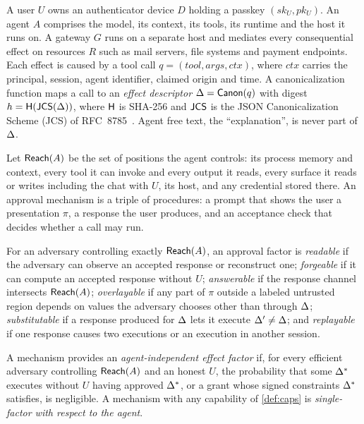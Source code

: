 A user $U$ owns an authenticator device $D$ holding a passkey $(sk_U, pk_U)$. An agent $A$ comprises the model,
its context, its tools, its runtime and the host it runs on. A gateway $G$ runs on a separate host and mediates
every consequential effect on resources $R$ such as mail servers, file systems and payment endpoints. Each effect
is caused by a tool call $q=(\mathit{tool},\mathit{args},\mathit{ctx})$, where $\mathit{ctx}$ carries the
principal, session, agent identifier, claimed origin and time. A canonicalization function maps a call to an
\emph{effect descriptor} $\Delta=\mathsf{Canon}(q)$ with digest $h=\mathsf{H}(\mathsf{JCS}(\Delta))$, where $\mathsf{H}$ is
SHA-256 and $\mathsf{JCS}$ is the JSON Canonicalization Scheme (JCS) of RFC~8785~\citep{rfc8785}. Agent free text, the
``explanation'', is never part of $\Delta$.

Let $\mathsf{Reach}(A)$ be the set of positions the agent controls: its process memory and context, every tool it can
invoke and every output it reads, every surface it reads or writes including the chat with $U$, its host, and
any credential stored there. An approval mechanism is a triple of procedures: a prompt that shows the user a
presentation $\pi$, a response the user produces, and an acceptance check that decides whether a call may run.

\begin{definition}\label{def:caps}
For an adversary controlling exactly $\mathsf{Reach}(A)$, an approval factor is \emph{readable} if the adversary can
observe an accepted response or reconstruct one; \emph{forgeable} if it can compute an accepted response without
$U$; \emph{answerable} if the response channel intersects $\mathsf{Reach}(A)$; \emph{overlayable} if any part of $\pi$
outside a labeled untrusted region depends on values the adversary chooses other than through $\Delta$;
\emph{substitutable} if a response produced for $\Delta$ lets it execute $\Delta'\neq\Delta$; and
\emph{replayable} if one response causes two executions or an execution in another session.
\end{definition}

\begin{definition}\label{def:independence}
A mechanism provides an \emph{agent-independent effect factor} if, for every efficient adversary controlling
$\mathsf{Reach}(A)$ and an honest $U$, the probability that some $\Delta^\ast$ executes without $U$ having approved
$\Delta^\ast$, or a grant whose signed constraints $\Delta^\ast$ satisfies, is negligible. A mechanism with any
capability of \cref{def:caps} is \emph{single-factor with respect to the agent}.
\end{definition}

